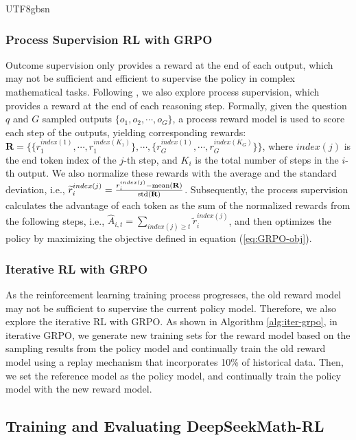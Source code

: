 \documentclass[11pt, a4paper, logo, copyright, nonumbering]{deepseek}
\newcommand{\spmath}{DeepSeekMath}
\begin{document}
\begin{CJK*}{UTF8}{gbsn}
\subsubsection{Process Supervision RL with GRPO} 
Outcome supervision only provides a reward at the end of each output, which may not be sufficient and efficient to supervise the policy in complex mathematical tasks. Following \cite{wang2023math}, we also explore process supervision, which provides a reward at the end of each reasoning step. Formally, given the question $q$ and $G$  sampled outputs $\{o_1, o_2, \cdots, o_G\}$, a process reward model is used to score each step of the outputs, yielding corresponding rewards: $\mathbf{R} = \{ \{r_1^{index(1)},\cdots,r_1^{index(K_1)}\}, \cdots,  \{r_G^{index(1)},\cdots,r_G^{index(K_G)}\} \}$, where $index(j)$ is the end token index of the $j$-th step, and $K_i$ is the total number of steps in the $i$-th output. We also normalize these rewards with the average and the standard deviation, i.e., $\widetilde{r}_i^{index(j)} = \frac{r_i^{index(j)} - {\rm mean(\mathbf{R})}}{{\rm std(\mathbf{R})}}$.
Subsequently, the process supervision calculates the advantage of each token as the sum of the normalized rewards from the following steps, i.e., $\hat{A}_{i, t} = \sum_{index(j) \ge t} \widetilde{r}_i^{index(j)}$,
and then optimizes the policy by maximizing the objective defined in equation (\ref{eq:GRPO-obj}).

\subsubsection{Iterative RL with GRPO}
As the reinforcement learning training process progresses, the old reward model may not be sufficient to supervise the current policy model.
Therefore, we also explore the iterative RL with GRPO.
As shown in Algorithm \ref{alg:iter-grpo}, in iterative GRPO, we generate new training sets for the reward model based on the sampling results from the policy model and continually train the old reward model using a replay mechanism that incorporates 10\% of historical data.
Then, we set the reference model as the policy model, and continually train the policy model with the new reward model.

\subsection{Training and Evaluating \spmath-RL}


\end{CJK*}
\end{document}
